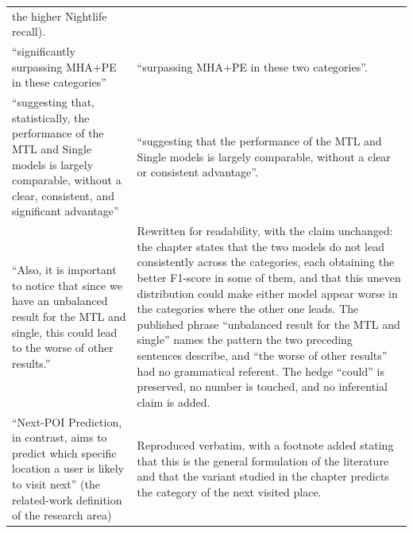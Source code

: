 {\begin{longtable}{@{}p{}p{}@{}}
the higher Nightlife recall). \\
``significantly surpassing MHA+PE in these categories'' &
``surpassing MHA+PE in these two categories''. \\
``suggesting that, statistically, the performance of the MTL and Single models is
largely comparable, without a clear, consistent, and significant advantage'' &
``suggesting that the performance of the MTL and Single models is largely comparable,
without a clear or consistent advantage''. \\
\addlinespace
``Also, it is important to notice that since we have an unbalanced result for the MTL
and single, this could lead to the worse of other results.'' &
Rewritten for readability, with the claim unchanged: the chapter states that the two
models do not lead consistently across the categories, each obtaining the better
F1-score in some of them, and that this uneven distribution could make either model
appear worse in the categories where the other one leads. The published phrase
``unbalanced result for the MTL and single'' names the pattern the two preceding
sentences describe, and ``the worse of other results'' had no grammatical referent. The
hedge ``could'' is preserved, no number is touched, and no inferential claim is added. \\
\addlinespace
``Next-POI Prediction, in contrast, aims to predict which specific location a user is
likely to visit next'' (the related-work definition of the research area) &
Reproduced verbatim, with a footnote added stating that this is the general formulation
of the literature and that the variant studied in the chapter predicts the category of
the next visited place. \\
\end{longtable}
}
